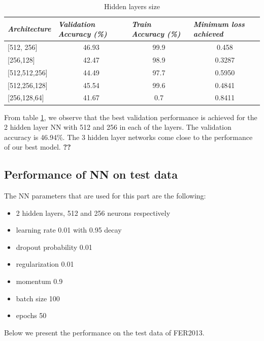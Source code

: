 \documentclass[12pt,twoside]{article}
\begin{document}
\begin{table}[!htbp]
\centering
\begin{tabular}{|l|c|c|c|}
\hline
\textit{\textbf{Architecture}} & \multicolumn{1}{l|}{\textit{\textbf{Validation Accuracy (\%)}}} & \multicolumn{1}{l|}{\textit{\textbf{Train Accuracy (\%)}}} & \multicolumn{1}{l|}{\textit{\textbf{Minimum loss achieved}}} \\ \hline
{[}512, 256{]}                 & 46.93                                                           & 99.9                                                       & 0.458                                                        \\ \hline
{[}256,128{]}                  & 42.47                                                           & 98.9                                                       & 0.3287                                                       \\ \hline
{[}512,512,256{]}              & 44.49                                                           & 97.7                                                       & 0.5950                                                       \\ \hline
{[}512,256,128{]}              & 45.54                                                           & 99.6                                                       & 0.4841                                                       \\ \hline
{[}256,128,64{]}               & 41.67                                                           & 0.7                                                        & 0.8411                                                       \\ \hline
\end{tabular}
\caption{Hidden layers size}
\label{layers}
\end{table}

From table \ref{layers}, we observe that the best validation performance is achieved for the 2 hidden layer NN with 512 and 256 in each of the layers. The validation accuracy is 46.94\%. The 3 hidden layer networks come close to the performance of our best model. \textbf{??}


\subsection{Performance of NN on test data}

The NN parameters that are used for this part are the following:
\begin{itemize}
\item 2 hidden layers, 512 and 256 neurons respectively
\item learning rate 0.01 with 0.95 decay
\item dropout probability 0.01
\item regularization 0.01
\item momentum 0.9
\item batch size 100
\item epochs 50
\end{itemize}
Below we present the performance on the test data of FER2013.
\end{document}
